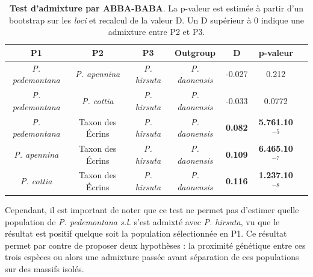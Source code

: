 \begin{table}
\begin{tabular}{ccccccc}\\\toprule  
P1 & P2 & P3 & Outgroup & D & p-valeur \\ \midrule
\textit{P. pedemontana} & \textit{P. apennina} & \textit{P. hirsuta} & \textit{P. daonensis} & -0.027 & 0.212 \\
\textit{P. pedemontana} & \textit{P. cottia} & \textit{P. hirsuta} & \textit{P. daonensis} & -0.033 & 0.0772 \\ \midrule
\textit{P. pedemontana} & Taxon des Écrins & \textit{P. hirsuta} & \textit{P. daonensis} & \textbf{0.082} & \textbf{5.761.10$^{-5}$} \\
\textit{P. apennina} & Taxon des Écrins & \textit{P. hirsuta} & \textit{P. daonensis} & \textbf{0.109} & \textbf{6.465.10$^{-7}$} \\
\textit{P. cottia} & Taxon des Écrins & \textit{P. hirsuta} & \textit{P. daonensis} & \textbf{0.116} & \textbf{1.237.10$^{-8}$} \\ \bottomrule
\end{tabular}
\caption{\textbf{Test d'admixture par ABBA-BABA}. La p-valeur est estimée à partir d'un bootstrap sur les \textit{loci} et recalcul de la valeur D. Un D supérieur à 0 indique une admixture entre P2 et P3.}
\label{ABBA}
\end{table}

Cependant, il est important de noter que ce test ne permet pas d'estimer quelle population de \textit{P. pedemontana s.l.} s'est admixté avec \textit{P. hirsuta}, vu que le résultat est positif quelque soit la population sélectionnée en P1. Ce résultat permet par contre de proposer deux hypothèses : la proximité génétique entre ces trois espèces ou alors une admixture passée avant séparation de ces populations sur des massifs isolés.


